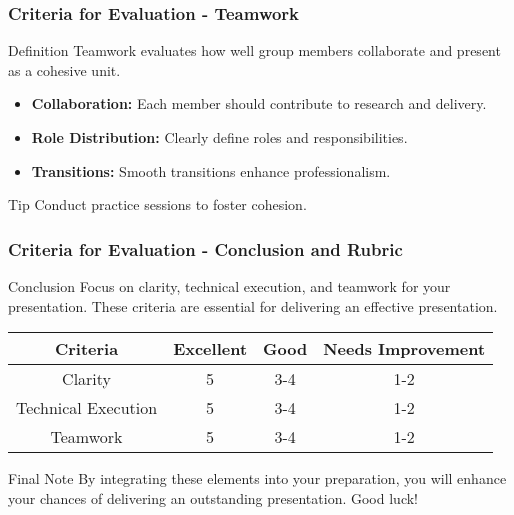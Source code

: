 \documentclass[aspectratio=169]{beamer}
\begin{document}
\begin{frame}[fragile]
    \frametitle{Criteria for Evaluation - Teamwork}
    \begin{block}{Definition}
        Teamwork evaluates how well group members collaborate and present as a cohesive unit.
    \end{block}
    \begin{itemize}
        \item \textbf{Collaboration:} Each member should contribute to research and delivery.
        \item \textbf{Role Distribution:} Clearly define roles and responsibilities.
        \item \textbf{Transitions:} Smooth transitions enhance professionalism.
    \end{itemize}

    \begin{block}{Tip}
        Conduct practice sessions to foster cohesion.
    \end{block}
\end{frame}

\begin{frame}[fragile]
    \frametitle{Criteria for Evaluation - Conclusion and Rubric}
    \begin{block}{Conclusion}
        Focus on clarity, technical execution, and teamwork for your presentation. These criteria are essential for delivering an effective presentation.
    \end{block}

    \begin{table}[ht]
        \centering
        \begin{tabular}{|c|c|c|c|}
            \hline
            \textbf{Criteria} & \textbf{Excellent} & \textbf{Good} & \textbf{Needs Improvement} \\
            \hline
            Clarity & 5 & 3-4 & 1-2 \\
            \hline
            Technical Execution & 5 & 3-4 & 1-2 \\
            \hline
            Teamwork & 5 & 3-4 & 1-2 \\
            \hline
        \end{tabular}
    \end{table}

    \begin{block}{Final Note}
        By integrating these elements into your preparation, you will enhance your chances of delivering an outstanding presentation. Good luck!
    \end{block}
\end{frame}
\end{document}
